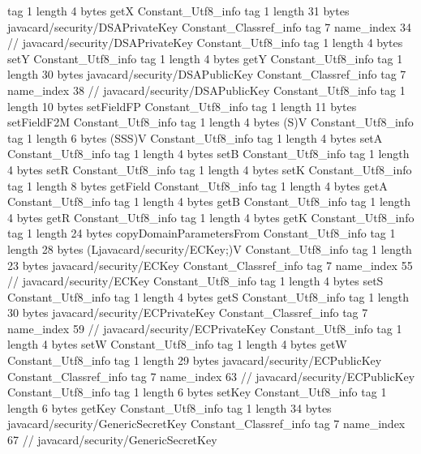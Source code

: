 {{{			tag	1
			length	4
			bytes	getX
		}
		Constant_Utf8_info {
			tag	1
			length	31
			bytes	javacard/security/DSAPrivateKey
		}
		Constant_Classref_info {
			tag	7
			name_index	34		// javacard/security/DSAPrivateKey
		}
		Constant_Utf8_info {
			tag	1
			length	4
			bytes	setY
		}
		Constant_Utf8_info {
			tag	1
			length	4
			bytes	getY
		}
		Constant_Utf8_info {
			tag	1
			length	30
			bytes	javacard/security/DSAPublicKey
		}
		Constant_Classref_info {
			tag	7
			name_index	38		// javacard/security/DSAPublicKey
		}
		Constant_Utf8_info {
			tag	1
			length	10
			bytes	setFieldFP
		}
		Constant_Utf8_info {
			tag	1
			length	11
			bytes	setFieldF2M
		}
		Constant_Utf8_info {
			tag	1
			length	4
			bytes	(S)V
		}
		Constant_Utf8_info {
			tag	1
			length	6
			bytes	(SSS)V
		}
		Constant_Utf8_info {
			tag	1
			length	4
			bytes	setA
		}
		Constant_Utf8_info {
			tag	1
			length	4
			bytes	setB
		}
		Constant_Utf8_info {
			tag	1
			length	4
			bytes	setR
		}
		Constant_Utf8_info {
			tag	1
			length	4
			bytes	setK
		}
		Constant_Utf8_info {
			tag	1
			length	8
			bytes	getField
		}
		Constant_Utf8_info {
			tag	1
			length	4
			bytes	getA
		}
		Constant_Utf8_info {
			tag	1
			length	4
			bytes	getB
		}
		Constant_Utf8_info {
			tag	1
			length	4
			bytes	getR
		}
		Constant_Utf8_info {
			tag	1
			length	4
			bytes	getK
		}
		Constant_Utf8_info {
			tag	1
			length	24
			bytes	copyDomainParametersFrom
		}
		Constant_Utf8_info {
			tag	1
			length	28
			bytes	(Ljavacard/security/ECKey;)V
		}
		Constant_Utf8_info {
			tag	1
			length	23
			bytes	javacard/security/ECKey
		}
		Constant_Classref_info {
			tag	7
			name_index	55		// javacard/security/ECKey
		}
		Constant_Utf8_info {
			tag	1
			length	4
			bytes	setS
		}
		Constant_Utf8_info {
			tag	1
			length	4
			bytes	getS
		}
		Constant_Utf8_info {
			tag	1
			length	30
			bytes	javacard/security/ECPrivateKey
		}
		Constant_Classref_info {
			tag	7
			name_index	59		// javacard/security/ECPrivateKey
		}
		Constant_Utf8_info {
			tag	1
			length	4
			bytes	setW
		}
		Constant_Utf8_info {
			tag	1
			length	4
			bytes	getW
		}
		Constant_Utf8_info {
			tag	1
			length	29
			bytes	javacard/security/ECPublicKey
		}
		Constant_Classref_info {
			tag	7
			name_index	63		// javacard/security/ECPublicKey
		}
		Constant_Utf8_info {
			tag	1
			length	6
			bytes	setKey
		}
		Constant_Utf8_info {
			tag	1
			length	6
			bytes	getKey
		}
		Constant_Utf8_info {
			tag	1
			length	34
			bytes	javacard/security/GenericSecretKey
		}
		Constant_Classref_info {
			tag	7
			name_index	67		// javacard/security/GenericSecretKey
}}}
